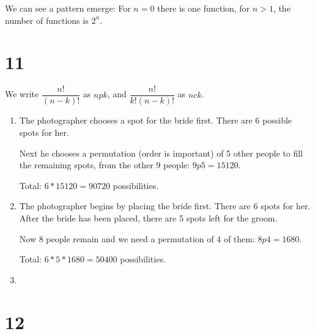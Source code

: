 \documentclass[12pt]{article}
\begin{document}
We can see a pattern emerge: For $n = 0$ there is one function, for $n > 1$, the number of functions is $2^n$.

\section*{11}
We write $\dfrac{n!}{(n - k)!}$ as $n p k$, and $\dfrac{n!}{k!(n - k)!}$ as $n c k$.

\begin{enumerate}[a]
	\item %
	The photographer chooses a spot for the bride first. There are 6 possible spots for her.

	Next he chooses a permutation (order is important) of 5 other people to fill the remaining spots, from the other 9 people: $9p5 = 15120$.

	Total: $6 * 15120 = 90720$ possibilities.
	\item %
	The photographer begins by placing the bride first. There are 6 spots for her. After the bride has been placed, there are 5 spots left for the groom.

	Now 8 people remain and we need a permutation of 4 of them: $8p4 = 1680$.

	Total: $6 * 5 * 1680 = 50400$ possibilities.
	\item %
\end{enumerate}

\section*{12}
\end{document}
